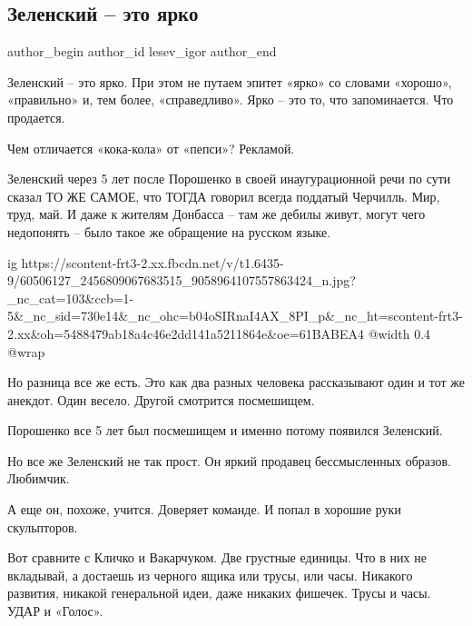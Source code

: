  
 
 
 
 
 
\subsection{Зеленский – это ярко}
\label{sec:20_05_2019.fb.lesev_igor.1.zelenskii_jarko}
 
\ifcmt
 author_begin
   author_id lesev_igor
 author_end
\fi

Зеленский – это ярко. При этом не путаем эпитет «ярко» со словами «хорошо»,
«правильно» и, тем более, «справедливо». Ярко – это то, что запоминается. Что
продается.

Чем отличается «кока-кола» от «пепси»? Рекламой.

Зеленский через 5 лет после Порошенко в своей инаугурационной речи по сути
сказал ТО ЖЕ САМОЕ, что ТОГДА говорил всегда поддатый Черчилль. Мир, труд, май.
И даже к жителям Донбасса – там же дебилы живут, могут чего недопонять – было
такое же обращение на русском языке.

\ifcmt
  ig https://scontent-frt3-2.xx.fbcdn.net/v/t1.6435-9/60506127_2456809067683515_9058964107557863424_n.jpg?_nc_cat=103&ccb=1-5&_nc_sid=730e14&_nc_ohc=b04oSIRnaI4AX_8PI_p&_nc_ht=scontent-frt3-2.xx&oh=5488479ab18a4c46e2dd141a5211864e&oe=61BABEA4
  @width 0.4
  @wrap 
\fi

Но разница все же есть. Это как два разных человека рассказывают один и тот же
анекдот. Один весело. Другой смотрится посмешищем.

Порошенко все 5 лет был посмешищем и именно потому появился Зеленский.

Но все же Зеленский не так прост. Он яркий продавец бессмысленных образов.
Любимчик.

А еще он, похоже, учится. Доверяет команде. И попал в хорошие руки скульпторов.

Вот сравните с Кличко и Вакарчуком. Две грустные единицы. Что в них не
вкладывай, а достаешь из черного ящика или трусы, или часы. Никакого развития,
никакой генеральной идеи, даже никаких фишечек. Трусы и часы. УДАР и «Голос».

